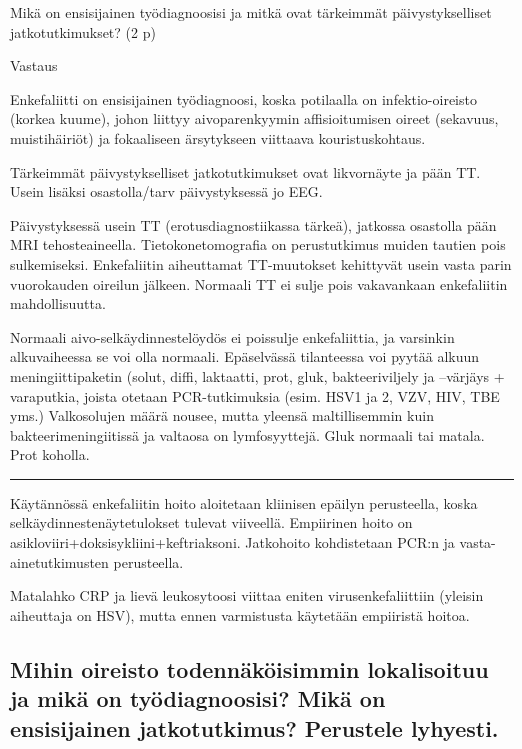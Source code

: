 \documentclass[
]{book}
\begin{document}
Mikä on ensisijainen työdiagnoosisi ja mitkä ovat tärkeimmät päivystykselliset jatkotutkimukset? (2 p)

Vastaus

Enkefaliitti on ensisijainen työdiagnoosi, koska potilaalla on infektio-oireisto (korkea kuume), johon liittyy aivoparenkyymin affisioitumisen oireet (sekavuus, muistihäiriöt) ja fokaaliseen ärsytykseen viittaava kouristuskohtaus.

Tärkeimmät päivystykselliset jatkotutkimukset ovat likvornäyte ja pään TT. Usein lisäksi osastolla/tarv päivystyksessä jo EEG.

Päivystyksessä usein TT (erotusdiagnostiikassa tärkeä), jatkossa osastolla pään MRI tehosteaineella. Tietokonetomografia on perustutkimus muiden tautien pois sulkemiseksi. Enkefaliitin aiheuttamat TT-muutokset kehittyvät usein vasta parin vuorokauden oireilun jälkeen. Normaali TT ei sulje pois vakavankaan enkefaliitin mahdollisuutta.

Normaali aivo-selkäydinnestelöydös ei poissulje enkefaliittia, ja varsinkin alkuvaiheessa se voi olla normaali. Epäselvässä tilanteessa voi pyytää alkuun meningiittipaketin (solut, diffi, laktaatti, prot, gluk, bakteeriviljely ja --värjäys + varaputkia, joista otetaan PCR-tutkimuksia (esim. HSV1 ja 2, VZV, HIV, TBE yms.) Valkosolujen määrä nousee, mutta yleensä maltillisemmin kuin bakteerimeningiitissä ja valtaosa on lymfosyyttejä. Gluk normaali tai matala. Prot koholla.

\begin{center}\rule{0.5\linewidth}{0.5pt}\end{center}

Käytännössä enkefaliitin hoito aloitetaan kliinisen epäilyn perusteella, koska selkäydinnestenäytetulokset tulevat viiveellä. Empiirinen hoito on asikloviiri+doksisykliini+keftriaksoni. Jatkohoito kohdistetaan PCR:n ja vasta-ainetutkimusten perusteella.

Matalahko CRP ja lievä leukosytoosi viittaa eniten virusenkefaliittiin (yleisin aiheuttaja on HSV), mutta ennen varmistusta käytetään empiiristä hoitoa.

\subsection{Mihin oireisto todennäköisimmin lokalisoituu ja mikä on työdiagnoosisi? Mikä on ensisijainen jatkotutkimus? Perustele lyhyesti.}\label{mihin-oireisto-todennuxe4kuxf6isimmin-lokalisoituu-ja-mikuxe4-on-tyuxf6diagnoosisi-mikuxe4-on-ensisijainen-jatkotutkimus-perustele-lyhyesti.}
\end{document}
